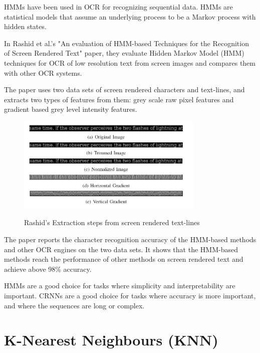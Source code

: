 HMMs have been used in OCR for recognizing sequential data. HMMs are statistical models that assume an underlying process to be a Markov process with hidden states.


In Rashid et al.'s "An evaluation of HMM-based Techniques for the Recognition of Screen Rendered Text" paper, they evaluate Hidden Markov Model (HMM) techniques for OCR of low resolution text from screen images and compares them with other OCR systems.

The paper uses two data sets of screen rendered characters and text-lines, and extracts two types of features from them: grey scale raw pixel features and gradient based grey level intensity features.


\begin{figure}[!h]
    \centering
    \includegraphics[width=0.8\textwidth]{Figures/HMM_Rashid.jpg}
    \caption[Rashid's Extraction steps from screen rendered text-lines]{Rashid's Extraction steps from screen rendered text-lines}\cite{rashidEvaluationHMMBasedTechniques2011}
    \label{fig:Rashid Feature Extraction Steps}
\end{figure}

The paper reports the character recognition accuracy of the HMM-based methods and other OCR engines on the two data sets. It shows that the HMM-based methods reach the performance of other methods on screen rendered text and achieve above 98\% accuracy.\cite{rashidEvaluationHMMBasedTechniques2011}

HMMs are a good choice for tasks where simplicity and interpretability are important. CRNNs are a good choice for tasks where accuracy is more important, and where the sequences are long or complex.

\newpage

\section{K-Nearest Neighbours (KNN)}

